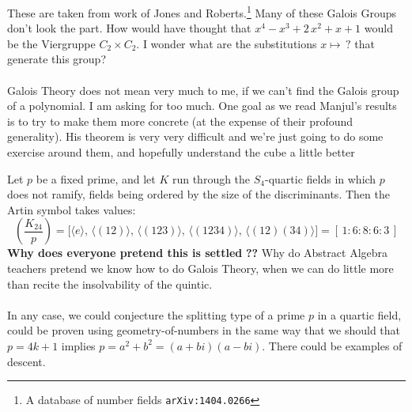 \documentclass[12pt]{article}
\begin{document}
These are taken from work of Jones and Roberts.\footnote{A database of number fields \texttt{arXiv:1404.0266}} Many of these Galois Groups don't look the part. How would have thought that $x^4 - x^3 + 2\,x^2 + x + 1$ would be the Viergruppe $ C_2  \times C_2$.  I wonder what are the substitutions $ x \mapsto \,? $ that generate this group?  \\ \\
Galois Theory does not mean very much to me, if we can't find the Galois group of a polynomial.  I am asking for too much.  One goal as we read Manjul's results is to try to make them more concrete (at the expense of their profound generality).  His theorem is very very difficult and we're just going to do some exercise around them, and hopefully understand the cube a little better \\

\newpage

\noindent Let $p$ be a fixed prime, and let $K$ run through the $S_4$-quartic fields in which $p$ does not ramify, fields being ordered by the size of the discriminants.  Then the Artin symbol takes values:
$$ \left( \frac{K_{24}}{p}\right)
= \Big[\langle e \rangle 
,\, \big\langle (12) \big\rangle
,\, \big\langle (123) \big\rangle
,\, \big\langle (1234) \big\rangle
,\, \big\langle (12)(34) \big\rangle \Big] = [\,1:6:8:6:3\,]$$
{\color{orange!50!green}\textbf{Why does everyone pretend this is settled}}\textbf{ ??} Why do Abstract Algebra teachers pretend we know how to do Galois Theory, when we can do little more than recite the insolvability of the quintic. \\ \\
In any case, we could conjecture the splitting type of a prime $p$ in a quartic field, could be proven using geometry-of-numbers in the same way that we should that $p = 4k+1 $ implies $p = a^2 + b^2 = (a+bi)(a-bi)$. There could be examples of descent.
\end{document}
